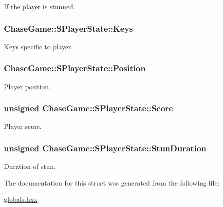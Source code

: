If the player is stunned. 

\hypertarget{struct_chase_game_1_1_s_player_state_a3fc9ce0322ed28ff9c401983d91c69f2}{
\subsubsection[{Keys}]{ Chase\-Game\-::\-S\-Player\-State\-::\-Keys}}\label{struct_chase_game_1_1_s_player_state_a3fc9ce0322ed28ff9c401983d91c69f2}


Keys specific to player. 

\hypertarget{struct_chase_game_1_1_s_player_state_a0a68b95a4255f2a543675f88b00847b4}{
\subsubsection[{Position}]{ Chase\-Game\-::\-S\-Player\-State\-::\-Position}}\label{struct_chase_game_1_1_s_player_state_a0a68b95a4255f2a543675f88b00847b4}


Player position. 

\hypertarget{struct_chase_game_1_1_s_player_state_a268594c795a70cf1eb9fe6061bfa57d0}{
\subsubsection[{Score}]{\setlength{\rightskip}{0pt plus 5cm}unsigned Chase\-Game\-::\-S\-Player\-State\-::\-Score}}\label{struct_chase_game_1_1_s_player_state_a268594c795a70cf1eb9fe6061bfa57d0}


Player score. 

\hypertarget{struct_chase_game_1_1_s_player_state_afc3caabd0eb284f7bfdddae63ac86da7}{
\subsubsection[{Stun\-Duration}]{\setlength{\rightskip}{0pt plus 5cm}unsigned Chase\-Game\-::\-S\-Player\-State\-::\-Stun\-Duration}}\label{struct_chase_game_1_1_s_player_state_afc3caabd0eb284f7bfdddae63ac86da7}


Duration of stun. 



The documentation for this struct was generated from the following file\-:\begin{DoxyCompactItemize}
\item 
\hyperlink{globals_8hxx}{globals.\-hxx}\end{DoxyCompactItemize}
